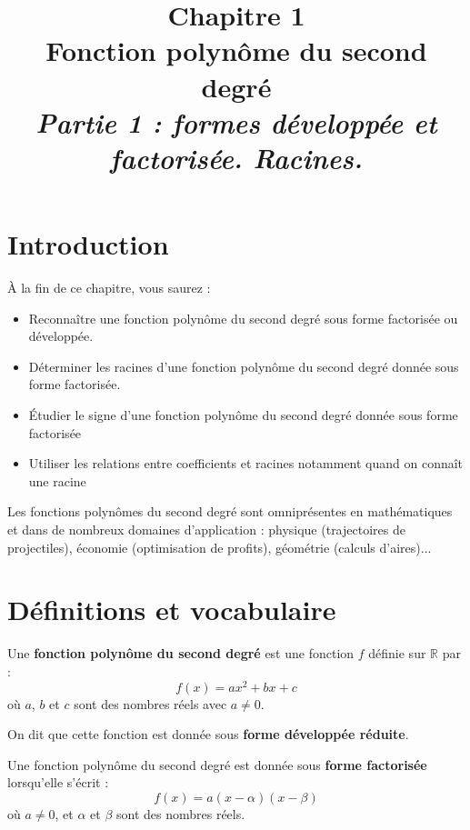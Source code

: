 \documentclass[11pt,a4paper]{article}
\title{
	\vspace{-2cm}
	\Huge\textbf{\textcolor{bleuprof}{Chapitre 1}}\\
	\vspace{0.5cm}
	\LARGE\textbf{Fonction polynôme du second degré}\\
	\large\textit{Partie 1 : formes développée et factorisée. Racines.}
}
\author{}
\date{}
\begin{document}
	
	\maketitle
	\vspace{-1cm}
	
	\section{Introduction}
	
	\begin{tcolorbox}[colback=gray!10!white, colframe=grisfonce, title=Objectifs du chapitre, fonttitle=\bfseries]
		À la fin de ce chapitre, vous saurez :
		\begin{itemize}[label=$\bullet$]
			\item Reconnaître une fonction polynôme du second degré sous forme factorisée ou développée.
			\item Déterminer les racines d'une fonction polynôme du second degré donnée sous forme factorisée.
			\item Étudier le signe d'une fonction polynôme du second degré donnée sous forme factorisée
			\item Utiliser les relations entre coefficients et racines notamment quand on connaît une racine
		\end{itemize}
	\end{tcolorbox}
	
	\vspace{0.5cm}
	
	Les fonctions polynômes du second degré sont omniprésentes en mathématiques et dans de nombreux domaines d'application : physique (trajectoires de projectiles), économie (optimisation de profits), géométrie (calculs d'aires)...
	
	\section{Définitions et vocabulaire}
	
	\begin{definition}
		Une \textbf{fonction polynôme du second degré} est une fonction $f$ définie sur $\mathbb{R}$ par :
		$$f(x) = ax^2 + bx + c$$
		où $a$, $b$ et $c$ sont des nombres réels avec $a \neq 0$.
		
		On dit que cette fonction est donnée sous \textbf{forme développée réduite}.
	\end{definition}
	
	\begin{definition}
		Une fonction polynôme du second degré est donnée sous \textbf{forme factorisée} lorsqu'elle s'écrit :
		$$f(x) = a(x - \alpha)(x - \beta)$$
		où $a \neq 0$, et $\alpha$ et $\beta$ sont des nombres réels.
	\end{definition}
	
\end{document}
